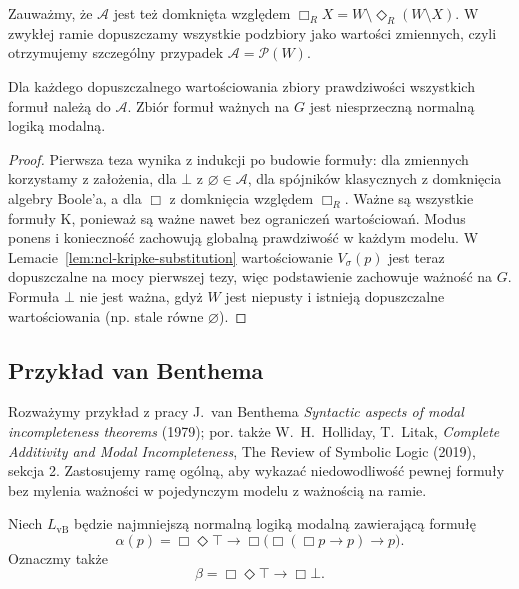 Zauważmy, że $\mathcal A$ jest też domknięta
względem $\Box_R X=W\setminus
\Diamond_R(W\setminus X)$.
W zwykłej ramie dopuszczamy wszystkie
podzbiory jako wartości zmiennych, czyli
otrzymujemy szczególny przypadek
$\mathcal A=\mathcal P(W)$.

\begin{lemat}
\label{lem:ncl-kripke-general-frame-soundness}
Dla każdego dopuszczalnego wartościowania
zbiory prawdziwości wszystkich formuł
należą do $\mathcal A$.
Zbiór formuł ważnych na $G$ jest
niesprzeczną normalną logiką modalną.
\end{lemat}
\begin{proof}
Pierwsza teza wynika z indukcji po budowie
formuły: dla zmiennych korzystamy z założenia,
dla $\bot$ z $\varnothing\in\mathcal A$,
dla spójników klasycznych z domknięcia
algebry Boole'a, a dla $\Box$ z domknięcia
względem $\Box_R$.
Ważne są wszystkie formuły K, ponieważ
są ważne nawet bez ograniczeń wartościowań.
Modus ponens i konieczność zachowują
globalną prawdziwość w każdym modelu.
W Lemacie~\ref{lem:ncl-kripke-substitution}
wartościowanie $V_\sigma(p)$ jest teraz
dopuszczalne na mocy pierwszej tezy,
więc podstawienie zachowuje ważność na $G$.
Formuła $\bot$ nie jest ważna, gdyż
$W$ jest niepusty i istnieją dopuszczalne
wartościowania (np. stale równe $\varnothing$).
\end{proof}

\subsection{Przykład van Benthema}

Rozważymy przykład z pracy J.~van Benthema
\emph{Syntactic aspects of modal incompleteness theorems}
(1979); por. także W.~H.~Holliday, T.~Litak,
\emph{Complete Additivity and Modal Incompleteness},
The Review of Symbolic Logic (2019), sekcja 2.
Zastosujemy ramę ogólną, aby wykazać
niedowodliwość pewnej formuły bez mylenia
ważności w pojedynczym modelu z ważnością na ramie.

\begin{definicja}
\label{def:ncl-kripke-vb-logic}
Niech $L_{\mathrm{vB}}$ będzie najmniejszą
normalną logiką modalną zawierającą formułę
\[
 \alpha(p)=\Box\Diamond\top
     \to\Box\bigl(\Box(\Box p\to p)\to p\bigr).
\]
Oznaczmy także
\[
 \beta=\Box\Diamond\top\to\Box\bot.
\]
\end{definicja}

